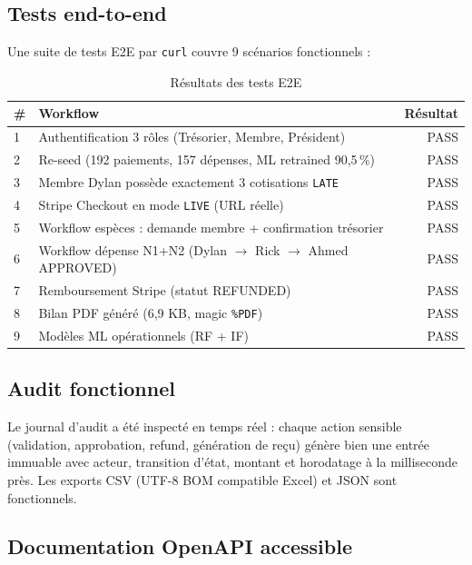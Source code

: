 \documentclass[11pt,a4paper]{article}
\begin{document}
\subsection{Tests end-to-end}

Une suite de tests E2E par \texttt{curl} couvre 9 scénarios fonctionnels :

\begin{table}[h]
  \centering
  \footnotesize
  \begin{tabularx}{\linewidth}{lXr}
    \toprule
    \textbf{\#} & \textbf{Workflow} & \textbf{Résultat} \\
    \midrule
    1 & Authentification 3 rôles (Trésorier, Membre, Président) & PASS \\
    2 & Re-seed (192 paiements, 157 dépenses, ML retrained 90{,}5\,\%) & PASS \\
    3 & Membre Dylan possède exactement 3 cotisations \texttt{LATE} & PASS \\
    4 & Stripe Checkout en mode \texttt{LIVE} (URL réelle) & PASS \\
    5 & Workflow espèces : demande membre + confirmation trésorier & PASS \\
    6 & Workflow dépense N1+N2 (Dylan $\rightarrow$ Rick $\rightarrow$ Ahmed APPROVED) & PASS \\
    7 & Remboursement Stripe (statut REFUNDED) & PASS \\
    8 & Bilan PDF généré (6{,}9 KB, magic \texttt{\%PDF}) & PASS \\
    9 & Modèles ML opérationnels (RF + IF) & PASS \\
    \bottomrule
  \end{tabularx}
  \caption{Résultats des tests E2E}
\end{table}

\subsection{Audit fonctionnel}

Le journal d'audit a été inspecté en temps réel : chaque action sensible (validation, approbation, refund, génération de reçu) génère bien une entrée immuable avec acteur, transition d'état, montant et horodatage à la milliseconde près. Les exports CSV (UTF-8 BOM compatible Excel) et JSON sont fonctionnels.

\subsection{Documentation OpenAPI accessible}
\end{document}
